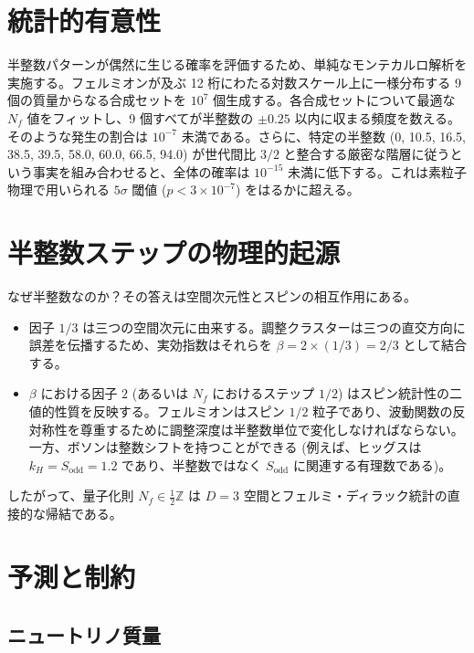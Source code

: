 \documentclass[12pt,a4paper]{article}
\newcommand{\Sodd}{S_{\mathrm{odd}}}
\begin{document}
	\section{統計的有意性}
	
	半整数パターンが偶然に生じる確率を評価するため、単純なモンテカルロ解析を実施する。フェルミオンが及ぶ 12 桁にわたる対数スケール上に一様分布する 9 個の質量からなる合成セットを \(10^7\) 個生成する。各合成セットについて最適な \(N_f\) 値をフィットし、9 個すべてが半整数の \(\pm 0.25\) 以内に収まる頻度を数える。そのような発生の割合は \(10^{-7}\) 未満である。さらに、特定の半整数 (0, 10.5, 16.5, 38.5, 39.5, 58.0, 60.0, 66.5, 94.0) が世代間比 \(3/2\) と整合する厳密な階層に従うという事実を組み合わせると、全体の確率は \(10^{-15}\) 未満に低下する。これは素粒子物理で用いられる \(5\sigma\) 閾値 (\(p < 3\times 10^{-7}\)) をはるかに超える。
	
	\section{半整数ステップの物理的起源}
	
	なぜ半整数なのか？その答えは空間次元性とスピンの相互作用にある。
	
	\begin{itemize}
		\item 因子 \(1/3\) は三つの空間次元に由来する。調整クラスターは三つの直交方向に誤差を伝播するため、実効指数はそれらを \(\beta = 2 \times (1/3) = 2/3\) として結合する。
		\item \(\beta\) における因子 \(2\) (あるいは \(N_f\) におけるステップ \(1/2\)) はスピン統計性の二値的性質を反映する。フェルミオンはスピン \(1/2\) 粒子であり、波動関数の反対称性を尊重するために調整深度は半整数単位で変化しなければならない。一方、ボソンは整数シフトを持つことができる (例えば、ヒッグスは \(k_H = \Sodd = 1.2\) であり、半整数ではなく \(\Sodd\) に関連する有理数である)。
	\end{itemize}
	
	したがって、量子化則 \(N_f \in \frac{1}{2}\mathbb{Z}\) は \(D=3\) 空間とフェルミ・ディラック統計の直接的な帰結である。
	
	\section{予測と制約}
	
	\subsection{ニュートリノ質量}
	
\end{document}
